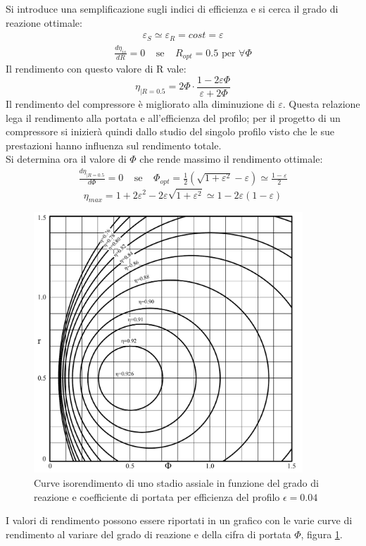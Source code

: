 Si introduce una semplificazione sugli indici di efficienza e si cerca il grado di reazione ottimale:
\begin{align*}
\varepsilon_S \simeq \varepsilon_R = cost = \varepsilon
\end{align*}
\begin{align*}
\frac{d \eta_{is}}{dR} = 0 \;\;\;\; \text{se}  \;\;\;\; R_{opt} = 0.5 \mbox{ per } \forall \Phi
\end{align*}
Il rendimento con questo valore di R vale:
\begin{equation}
\eta_{|R= 0.5} = 2 \Phi \cdot \frac{1- 2 \varepsilon \Phi}{\varepsilon + 2 \Phi}
\end{equation}
Il rendimento del compressore è migliorato alla diminuzione di $\varepsilon$. Questa relazione lega il rendimento alla portata e all'efficienza del profilo; per il progetto di un compressore si inizierà quindi dallo studio del singolo profilo visto che le sue prestazioni hanno influenza sul rendimento totale.\\
Si determina ora il valore di $\Phi$ che rende massimo il rendimento ottimale:
\begin{align*}
\frac{d\eta_{|R=0.5}}{d \Phi} = 0 \;\;\;\; \text{se} \;\;\;\; \Phi_{opt} = \frac{1}{2} \left( \sqrt{1 + \varepsilon^2} - \varepsilon \right) \simeq \frac{1 - \varepsilon}{2}
\end{align*}
\begin{equation}
\eta_{max} = 1 + 2 \varepsilon^2 - 2 \varepsilon \sqrt{1 + \varepsilon^2} \simeq 1 - 2 \varepsilon \left( 1 - \varepsilon \right)
\end{equation}
\begin{figure}
\centering
  \includegraphics[width=0.9\textwidth]{fig/IsoRendCompAss.pdf}
\caption{Curve isorendimento di uno stadio assiale in funzione del grado di reazione e coefficiente di portata per efficienza del profilo $\epsilon=0.04$}
\label{fig:isorendimento}
\end{figure}
I valori di rendimento possono essere riportati in un grafico con le varie curve di rendimento al variare del grado di reazione e della cifra di portata $\Phi$, figura \ref{fig:isorendimento}.

